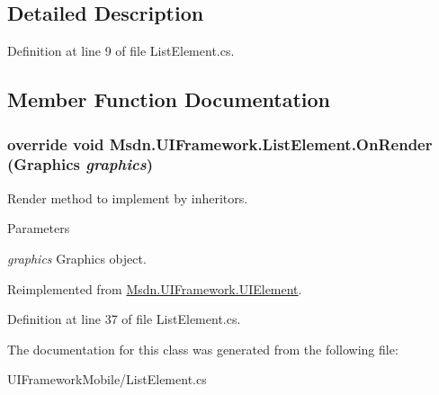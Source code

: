 \subsection{Detailed Description}


Definition at line 9 of file ListElement.cs.

\subsection{Member Function Documentation}
\hypertarget{class_msdn_1_1_u_i_framework_1_1_list_element_ac0b1519bbc015086de494e64b0238b5e}{
\subsubsection[{OnRender}]{\setlength{\rightskip}{0pt plus 5cm}override void Msdn.UIFramework.ListElement.OnRender (Graphics {\em graphics})}}
\label{class_msdn_1_1_u_i_framework_1_1_list_element_ac0b1519bbc015086de494e64b0238b5e}


Render method to implement by inheritors. 
\begin{DoxyParams}{Parameters}
\item[{\em graphics}]Graphics object.\end{DoxyParams}


Reimplemented from \hyperlink{class_msdn_1_1_u_i_framework_1_1_u_i_element_a20b2245806231553935896fe7731812b}{Msdn.UIFramework.UIElement}.

Definition at line 37 of file ListElement.cs.

The documentation for this class was generated from the following file:\begin{DoxyCompactItemize}
\item 
UIFrameworkMobile/ListElement.cs\end{DoxyCompactItemize}
